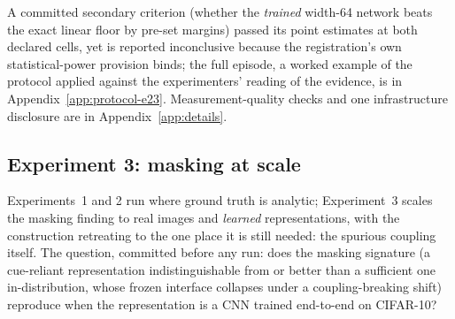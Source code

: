 \documentclass[twocolumn,10pt]{article}
\theoremstyle{definition}
\theoremstyle{remark}
\begin{document}
A committed secondary criterion (whether the \emph{trained}
width-64 network beats the exact linear floor by pre-set margins)
passed its point estimates at both declared cells, yet is reported
inconclusive because the registration's own statistical-power
provision binds; the full episode, a worked example of the protocol
applied against the experimenters' reading of the evidence, is in
Appendix~\ref{app:protocol-e23}. Measurement-quality checks and one
infrastructure disclosure are in Appendix~\ref{app:details}.

\subsection{Experiment 3: masking at scale}
\label{sec:exp3}

Experiments~1 and 2 run where ground truth is analytic; Experiment~3
scales the masking finding to real images and \emph{learned}
representations, with the construction retreating to the one place it
is still needed: the spurious coupling itself. The question,
committed before any run: does the masking signature (a
cue-reliant representation indistinguishable from or better than a
sufficient one in-distribution, whose frozen interface collapses
under a coupling-breaking shift) reproduce when the representation
is a CNN trained end-to-end on CIFAR-10?
\end{document}
